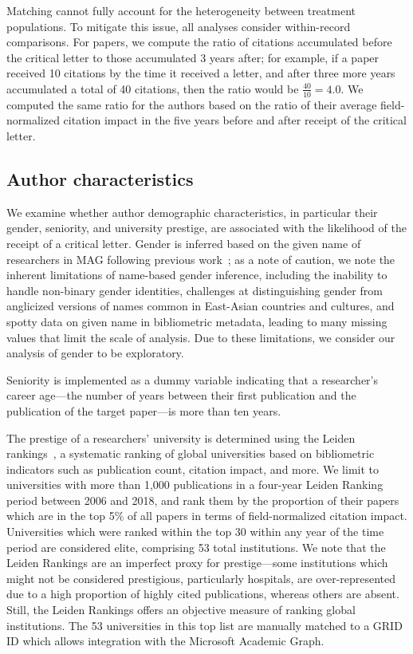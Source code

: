 \documentclass[12pt,a4paper]{article}
\numberwithin{equation}{section}
\begin{document}
Matching cannot fully account for the heterogeneity between treatment populations.
To mitigate this issue, all analyses consider within-record comparisons. 
For papers, we compute the ratio of citations accumulated before the critical letter to those accumulated 3 years after; for example, if a paper received 10 citations by the time it received a letter, and after three more years accumulated a total of 40 citations, then the ratio would be $\frac{40}{10} = 4.0$. 
We computed the same ratio for the authors based on the ratio of their average field-normalized citation impact in the five years before and after receipt of the critical letter.


\subsection*{Author characteristics}
We examine whether author demographic characteristics, in particular their gender, seniority, and university prestige, are associated with the likelihood of the receipt of a critical letter. 
Gender is inferred based on the given name of researchers in MAG following previous work~\cite{huang_2020_gender};
as a note of caution, we note the inherent limitations of name-based gender inference, including the inability to handle non-binary gender identities, challenges at distinguishing gender from anglicized versions of names common in East-Asian countries and cultures, and spotty data on given name in bibliometric metadata, leading to many missing values that limit the scale of analysis. 
Due to these limitations, we consider our analysis of gender to be exploratory. 

Seniority is implemented as a dummy variable indicating that a researcher's career age---the number of years between their first publication and the publication of the target paper---is more than ten years. 

The prestige of a researchers' university is determined using the Leiden rankings~\cite{van_eck_2023_leiden}, a systematic ranking of global universities based on bibliometric indicators such as publication count, citation impact, and more.
We limit to universities with more than 1,000 publications in a four-year Leiden Ranking period between 2006 and 2018, and rank them by the proportion of their papers which are in the top 5\% of all papers in terms of field-normalized citation impact.
Universities which were ranked within the top 30 within any year of the time period are considered elite, comprising 53 total institutions.
We note that the Leiden Rankings are an imperfect proxy for prestige---some institutions which might not be considered prestigious, particularly hospitals, are over-represented due to a high proportion of highly cited publications, whereas others are absent.
Still, the Leiden Rankings offers an objective measure of ranking global institutions.
The 53 universities in this top list are manually matched to a GRID ID which allows integration with the Microsoft Academic Graph. 
\end{document}
